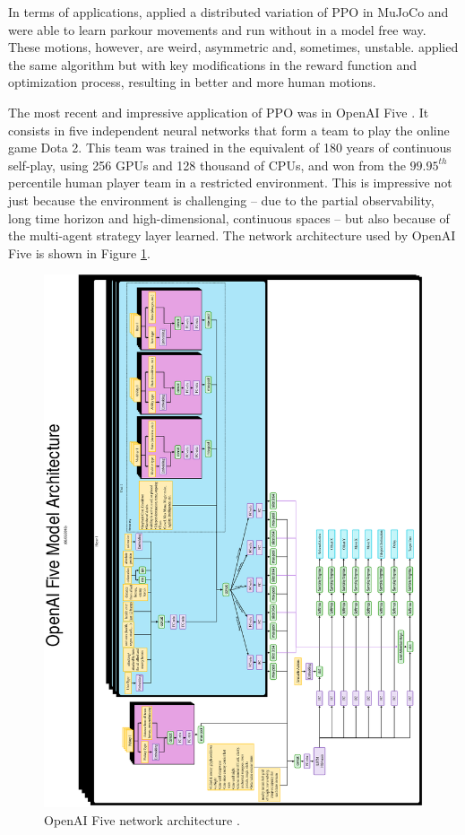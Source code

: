 In terms of applications, \cite{DBLP:journals/corr/HeessTSLMWTEWER17} applied a distributed variation of PPO in MuJoCo and were able to learn parkour movements and run without in a model free way. These motions, however, are weird, asymmetric and, sometimes, unstable. \cite{peng2018} applied the same algorithm but with key modifications in the reward function and optimization process, resulting in better and more human motions.

The most recent and impressive application of PPO was in OpenAI Five \cite{openaifive}. It consists in five independent neural networks that form a team to play the online game Dota 2. This team was trained in the equivalent of 180 years of continuous self-play, using 256 GPUs and 128 thousand of CPUs, and won from the $99.95^{th}$ percentile human player team in a restricted environment. This is impressive not just because the environment is challenging -- due to the partial observability, long time horizon and high-dimensional, continuous spaces -- but also because of the multi-agent strategy layer learned. The network architecture used by OpenAI Five is shown in Figure \ref{openaifive}.

\begin{figure}[ht!]
	\centering
	\includegraphics[angle=270, scale=0.5]{Cap2/openaifive.eps}
	\caption{OpenAI Five network architecture \cite{openaifive}.}
	\label{openaifive}
\end{figure}


